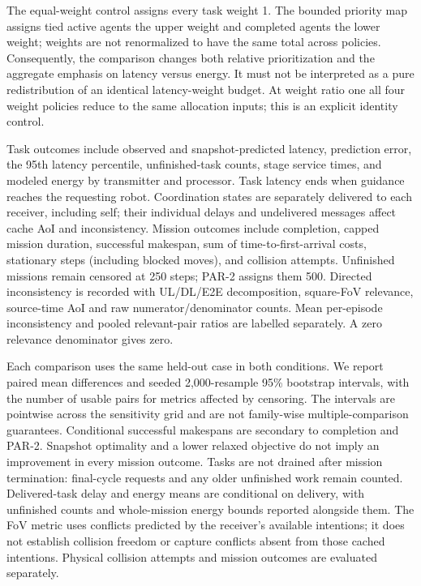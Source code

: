 The equal-weight control assigns every task weight 1. The bounded priority map
assigns tied active agents the upper weight and completed agents the lower weight;
weights are not renormalized to have the same total across policies. Consequently,
the comparison changes both relative prioritization and the aggregate emphasis
on latency versus energy. It must not be interpreted as a pure redistribution of
an identical latency-weight budget. At weight ratio one all four weight policies
reduce to the same allocation inputs; this is an explicit identity control.

Task outcomes include observed and snapshot-predicted latency, prediction error, the 95th latency percentile, unfinished-task counts, stage service times, and modeled energy by transmitter and processor. Task latency ends when guidance reaches the requesting robot. Coordination states are separately delivered to each receiver, including self; their individual delays and undelivered messages affect cache AoI and inconsistency. Mission outcomes include completion, capped mission duration, successful makespan, sum of time-to-first-arrival costs, stationary steps (including blocked moves), and collision attempts. Unfinished missions remain censored at 250 steps; PAR-2 assigns them 500. Directed inconsistency is recorded with UL/DL/E2E decomposition, square-FoV relevance, source-time AoI and raw numerator/denominator counts. Mean per-episode inconsistency and pooled relevant-pair ratios are labelled separately. A zero relevance denominator gives zero.

Each comparison uses the same held-out case in both conditions. We report paired mean differences and seeded 2,000-resample 95\% bootstrap intervals, with the number of usable pairs for metrics affected by censoring. The intervals are pointwise across the sensitivity grid and are not family-wise multiple-comparison guarantees. Conditional successful makespans are secondary to completion and PAR-2. Snapshot optimality and a lower relaxed objective do not imply an improvement in every mission outcome.
Tasks are not drained after mission termination: final-cycle requests and any older unfinished work remain counted. Delivered-task delay and energy means are conditional on delivery, with unfinished counts and whole-mission energy bounds reported alongside them. The FoV metric uses conflicts predicted by the receiver's available intentions; it does not establish collision freedom or capture conflicts absent from those cached intentions. Physical collision attempts and mission outcomes are evaluated separately.


